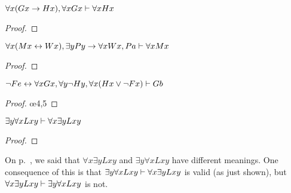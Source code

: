 \begin{earg}

\noindent\begin{minipage}{0.99\textwidth}
\item $\forall x(Gx \rightarrow Hx), \forall xGx \vdash \forall xHx$

\begin{proof}
	 \pr{}
	 \pr{}
	 
	 
	 
	 
\end{proof}
\bigskip
\end{minipage}


\item $\forall x(Mx \leftrightarrow Wx), \exists yPy \rightarrow \forall xWx, Pa \vdash \forall xMx$

\begin{proof}
	 \pr{}
	 \pr{}
	 \pr{}
	 
	 
	 
	 
	 
	 
\end{proof}
\bigskip

\noindent\begin{minipage}{0.99\textwidth}
\item${\neg} Fe \leftrightarrow \forall xGx, \forall y{\neg} Hy, \forall x(Hx \vee {\neg} Fx) \vdash Gb$

\begin{proof}
	 \pr{}
	 \pr{}
	 \pr{}
	 
	 
	 \oe{4,5}
	 
	 
\end{proof}
\bigskip
\end{minipage}

\noindent\begin{minipage}{0.99\textwidth}
\item $\exists y \forall xLxy \vdash \forall x \exists yLxy$

\begin{proof}
	 \pr{}
	\open
		 \as{}
		 
		 
		 
	\close
	 
\end{proof}
\smallskip
On p.~\pageref{quantifier-order}, we said that $\forall x \exists yLxy$ and $\exists y \forall xLxy$ have different meanings. One consequence of this is that $\exists y \forall xLxy \vdash \forall x \exists yLxy$ is valid (as just shown), but $\forall x \exists yLxy \vdash \exists y \forall xLxy$ is not. 
\bigskip
\end{minipage}



\end{earg}
